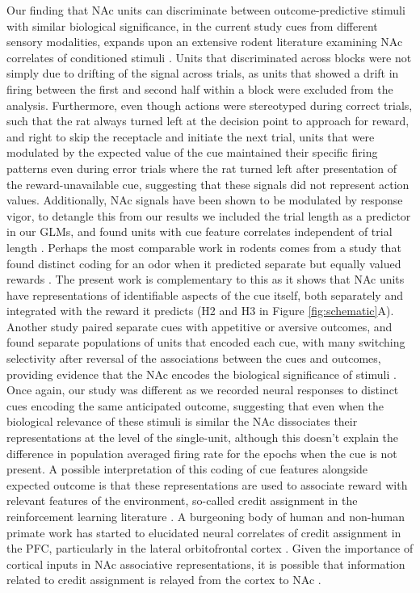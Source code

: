 \documentclass[11pt]{article}
\let\cite=\citep
\begin{document}
{Our finding that NAc units can discriminate between outcome-predictive stimuli with similar biological significance, in the current study cues from different sensory modalities, expands upon an extensive rodent literature examining NAc correlates of conditioned stimuli \cite{Ambroggi2008,Atallah2014,Bissonette2013,Cooch2015,Day2006,Dejean2017,Goldstein2012,Ishikawa2008,Lansink2012,McGinty2013,Nicola2004,Roesch2009a,Roitman2005,Saddoris2011,Setlow2003,Sugam2014,West2016,Yun2004}. Units that discriminated across blocks were not simply due to drifting of the signal across trials, as units that showed a drift in firing between the first and second half within a block were excluded from the analysis. Furthermore, even though actions were stereotyped during correct trials, such that the rat always turned left at the decision point to approach for reward, and right to skip the receptacle and initiate the next trial, units that were modulated by the expected value of the cue maintained their specific firing patterns even during error trials where the rat turned left after presentation of the reward-unavailable cue, suggesting that these signals did not represent action values. Additionally, NAc signals have been shown to be modulated by response vigor, to detangle this from our results we included the trial length as a predictor in our GLMs, and found units with cue feature correlates independent of trial length \cite{McGinty2013}. Perhaps the most comparable work in rodents comes from a study that found distinct coding for an odor when it predicted separate but equally valued rewards \cite{Cooch2015}. The present work is complementary to this as it shows that NAc units have representations of identifiable aspects of the cue itself, both separately and integrated with the reward it predicts (H2 and H3 in Figure \ref{fig:schematic}A). Another study paired separate cues with appetitive or aversive outcomes, and found separate populations of units that encoded each cue, with many switching selectivity after reversal of the associations between the cues and outcomes, providing evidence that the NAc encodes the biological significance of stimuli \cite{Setlow2003}. Once again, our study was different as we recorded neural responses to distinct cues encoding the same anticipated outcome, suggesting that even when the biological relevance of these stimuli is similar the NAc dissociates their representations at the level of the single-unit, although this doesn’t explain the difference in population averaged firing rate for the epochs when the cue is not present. A possible interpretation of this coding of cue features alongside expected outcome is that these representations are used to associate reward with relevant features of the environment, so-called credit assignment in the reinforcement learning literature \cite{sutton1998}. A burgeoning body of human and non-human primate work has started to elucidated neural correlates of credit assignment in the PFC, particularly in the lateral orbitofrontal cortex \cite{Akaishi2016,Asaad2017,Chau2015,Noonan2017}. Given the importance of cortical inputs in NAc associative representations, it is possible that information related to credit assignment is relayed from the cortex to NAc \cite{Cooch2015,Ishikawa2008}. 

}
\end{document}
